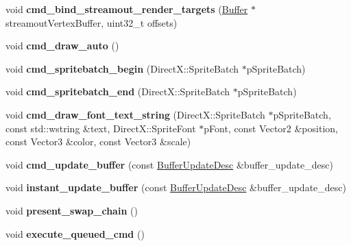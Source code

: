\begin{DoxyCompactItemize}
\mbox{\label{classDXRenderer_a8fdbb3e30aeeb14d719b6afcc086fe8d}} 
void {\bfseries cmd\+\_\+bind\+\_\+streamout\+\_\+render\+\_\+targets} (\hyperlink{classBuffer}{Buffer} $\ast$streamout\+Vertex\+Buffer, uint32\+\_\+t offsets)
\item 
\mbox{\label{classDXRenderer_a55c751afe6f80a0b39dbad2d65d75184}} 
void {\bfseries cmd\+\_\+draw\+\_\+auto} ()
\item 
\mbox{\label{classDXRenderer_a94f294bbd65dc04cc373d19325f1649e}} 
void {\bfseries cmd\+\_\+spritebatch\+\_\+begin} (Direct\+X\+::\+Sprite\+Batch $\ast$p\+Sprite\+Batch)
\item 
\mbox{\label{classDXRenderer_a711b4dc330c2e3054519d9c0321a97f8}} 
void {\bfseries cmd\+\_\+spritebatch\+\_\+end} (Direct\+X\+::\+Sprite\+Batch $\ast$p\+Sprite\+Batch)
\item 
\mbox{\label{classDXRenderer_a420c3dc3e945dac848986668f13b3715}} 
void {\bfseries cmd\+\_\+draw\+\_\+font\+\_\+text\+\_\+string} (Direct\+X\+::\+Sprite\+Batch $\ast$p\+Sprite\+Batch, const std\+::wstring \&text, Direct\+X\+::\+Sprite\+Font $\ast$p\+Font, const Vector2 \&position, const Vector3 \&color, const Vector3 \&scale)
\item 
\mbox{\label{classDXRenderer_ab3e0561b3419a6583505514eb979edba}} 
void {\bfseries cmd\+\_\+update\+\_\+buffer} (const \hyperlink{structBufferUpdateDesc}{Buffer\+Update\+Desc} \&buffer\+\_\+update\+\_\+desc)
\item 
\mbox{\label{classDXRenderer_a75fab54cd588ea681f1ac515a487ee36}} 
void {\bfseries instant\+\_\+update\+\_\+buffer} (const \hyperlink{structBufferUpdateDesc}{Buffer\+Update\+Desc} \&buffer\+\_\+update\+\_\+desc)
\item 
\mbox{\label{classDXRenderer_a9c8fd9abd296101a41ae021057810428}} 
void {\bfseries present\+\_\+swap\+\_\+chain} ()
\item 
\mbox{\label{classDXRenderer_a32e5bf490798b8135bdd3b9011c47a65}} 
void {\bfseries execute\+\_\+queued\+\_\+cmd} ()
\item 

\end{DoxyCompactItemize}
